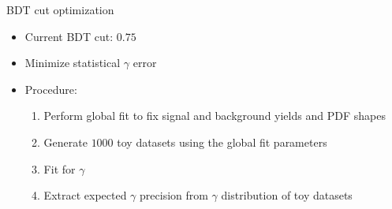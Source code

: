 \documentclass{beamer}
\begin{document}
\begin{frame}{BDT cut optimization}
  \begin{itemize}
    \setlength\itemsep{1.5em}
    \item{Current BDT cut: $0.75$}
    \item{Minimize statistical $\gamma$ error}
    \item{Procedure:}
    \begin{enumerate}
    \setlength\itemsep{0.5em}
      \item{Perform global fit to fix signal and background yields and PDF shapes}
      \item{Generate $1000$ toy datasets using the global fit parameters}
      \item{Fit for $\gamma$}
      \item{Extract expected $\gamma$ precision from $\gamma$ distribution of toy datasets}
    \end{enumerate}
  \end{itemize}
\end{frame}
\end{document}
